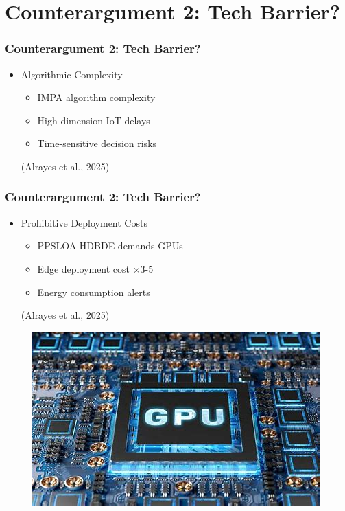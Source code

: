 \documentclass{beamer}
\begin{document}
\section{Counterargument 2: Tech Barrier?}
\begin{frame}
 \frametitle{Counterargument 2: Tech Barrier?}
\begin{minipage}{\textwidth}
{\linespread{1.8}
\begin{itemize}
    \item {\Large Algorithmic Complexity}\\
    \begin{itemize}
        \item <1-> {\large IMPA algorithm complexity}
        \item <2-> {\large High-dimension IoT delays}
        \item <3-> {\large Time-sensitive decision risks}
    \end{itemize}
    (Alrayes et al., 2025)
\end{itemize}
}

\end{minipage}
\end{frame}


\begin{frame}
 \frametitle{Counterargument 2: Tech Barrier?}
\begin{minipage}{\textwidth}
{\linespread{1.8}
\begin{itemize}
    \item {\Large Prohibitive Deployment Costs}
    \begin{itemize}
        \item <1-> {\large PPSLOA-HDBDE demands GPUs}
        \item <2-> {\large Edge deployment cost ×3-5}
        \item <3-> {\large Energy consumption alerts} 
    \end{itemize}
    (Alrayes et al., 2025)
\end{itemize}
}
\begin{figure}
    \centering
    \includegraphics[width=0.35\linewidth]{figure 6.png}
    \label{fig:enter-label}
\end{figure}

\end{minipage}
\end{frame}
\end{document}
